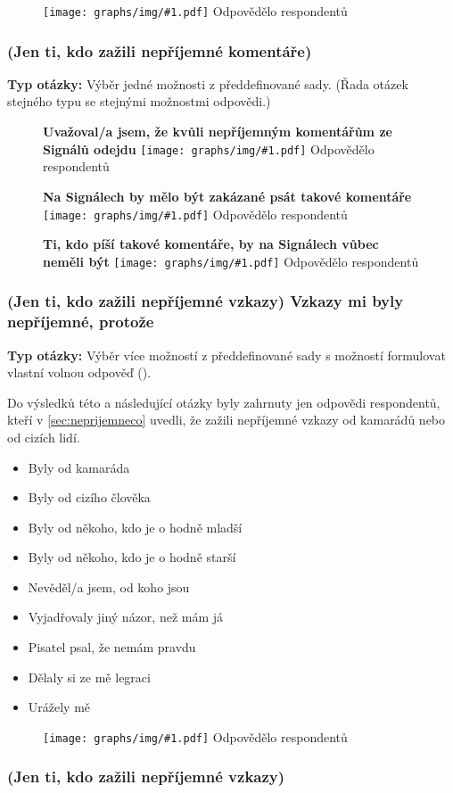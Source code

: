 \documentclass[12pt, a4paper, twoside]{article}
\newcommand{\answercount}[1]{Odpovědělo  respondentů}
\newcommand{\includegraph}[2]{
  \begin{figure}[H]
    \centering
    \textbf{#2}
    \texttt{[image: graphs/img/\#1.pdf]}
    \answercount{#1}
  \end{figure}
}
\newcommand{\qtype}{\textbf{Typ otázky:}
}
\newcommand{\pickOne}{Výběr jedné možnosti z předdefinované sady\xspace}
\newcommand{\pickMultiple}{Výběr více možností z předdefinované sady\xspace}
\newcommand{\withOther}{s možností formulovat vlastní volnou odpověď (\uv{Jiné})\xspace}
\newcommand{\series}{(Řada otázek stejného typu se stejnými možnostmi odpovědi.)\xspace}
\begin{document}
\includegraph{neprijemne_komentare_protoze}{}

\subsubsection{(Jen ti, kdo zažili nepříjemné komentáře)}

\qtype \pickOne. \series

\includegraph{neprijemne_komentare_zvazoval_odchod}{Uvažoval/a jsem, že kvůli nepříjemným komentářům ze Signálů odejdu}

\includegraph{neprijemne_komentare_zakazat}{Na Signálech by mělo být zakázané psát takové komentáře}

\includegraph{neprijemne_komentare_pisatele_pryc}{Ti, kdo píší takové komentáře, by na Signálech vůbec neměli být}

\subsubsection{(Jen ti, kdo zažili nepříjemné vzkazy) Vzkazy mi byly nepříjemné, protože}

\qtype \pickMultiple \withOther.

Do výsledků této a následující otázky byly zahrnuty
jen odpovědi respondentů,
kteří v \ref{sec:neprijemneco} uvedli, že zažili nepříjemné vzkazy
od kamarádů nebo od cizích lidí.

\begin{itemize}
\item Byly od kamaráda
\item Byly od cizího člověka
\item Byly od někoho, kdo je o hodně mladší
\item Byly od někoho, kdo je o hodně starší
\item Nevěděl/a jsem, od koho jsou
\item Vyjadřovaly jiný názor, než mám já
\item Pisatel psal, že nemám pravdu
\item Dělaly si ze mě legraci
\item Urážely mě
\end{itemize}

\includegraph{neprijemne_vzkazy_protoze}{}

\subsubsection{(Jen ti, kdo zažili nepříjemné vzkazy)}
\end{document}
